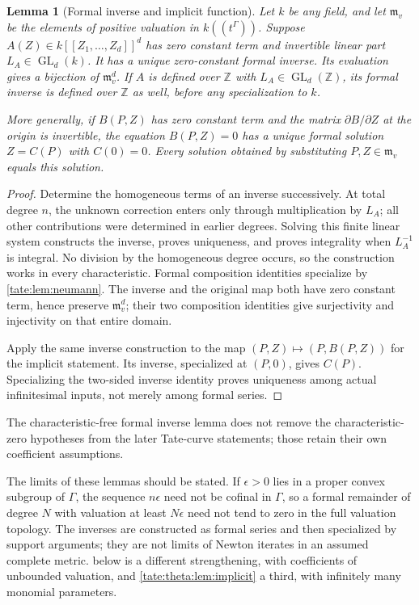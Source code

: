 \documentclass[11pt,letterpaper]{article}
\newtheorem{lemma}[lemma]{Lemma}
\theoremstyle{definition}
\newcommand{\Z}{\mathbb Z}
\newcommand{\m}{\mathfrak m}
\newcommand{\GL}{\operatorname{GL}}
\begin{document}
\begin{lemma}[Formal inverse and implicit function]\label{tate:node:lem:implicit}
Let $k$ be any field, and let $\m_v$ be the
elements of positive valuation in $k((t^\Gamma))$. Suppose
$A(Z)\in k[[Z_1,\ldots,Z_d]]^d$ has zero constant term and invertible
linear part $L_A\in\GL_d(k)$. It has a unique zero-constant formal inverse.
Its evaluation gives a bijection of $\m_v^d$.
If $A$ is defined over $\Z$ with $L_A\in\GL_d(\Z)$, its formal inverse
is defined over $\Z$ as well, before any specialization to $k$.

More generally, if $B(P,Z)$ has zero constant term and the matrix
$\partial B/\partial Z$ at the origin is invertible, the equation
$B(P,Z)=0$ has a unique formal solution $Z=C(P)$ with $C(0)=0$.
Every solution obtained by substituting $P,Z\in\m_v$ equals this solution.
\end{lemma}

\begin{proof}
Determine the homogeneous terms of an inverse successively. At total
degree $n$, the unknown correction enters only through multiplication by
$L_A$; all other contributions were determined in earlier degrees. Solving
this finite linear system constructs the inverse, proves uniqueness, and
proves integrality when $L_A^{-1}$ is integral. No division by the
homogeneous degree occurs, so the construction works in every
characteristic. Formal composition identities specialize by
\cref{tate:lem:neumann}. The inverse and the original map both have zero
constant term, hence preserve $\m_v^d$; their two composition identities
give surjectivity and injectivity on that entire domain.

Apply the same inverse construction to the map $(P,Z)\mapsto(P,B(P,Z))$
for the implicit statement. Its inverse, specialized at $(P,0)$, gives
$C(P)$. Specializing the two-sided inverse identity proves uniqueness among
actual infinitesimal inputs, not merely among formal series.
\end{proof}

The characteristic-free formal inverse lemma does not remove the
characteristic-zero hypotheses from the later Tate-curve statements;
those retain their own coefficient assumptions.

The limits of these lemmas should be stated. If $\epsilon>0$ lies in a
proper convex subgroup of $\Gamma$, the sequence $n\epsilon$ need not be
cofinal in $\Gamma$, so a formal remainder of degree $N$ with valuation at
least $N\epsilon$ need not tend to zero in the full valuation topology.
The inverses are constructed as formal series and then specialized by
support arguments; they are not limits of Newton iterates in an assumed
complete metric.  below is a different
strengthening, with coefficients of unbounded valuation, and
\cref{tate:theta:lem:implicit} a third, with infinitely many monomial
parameters.
\end{document}
